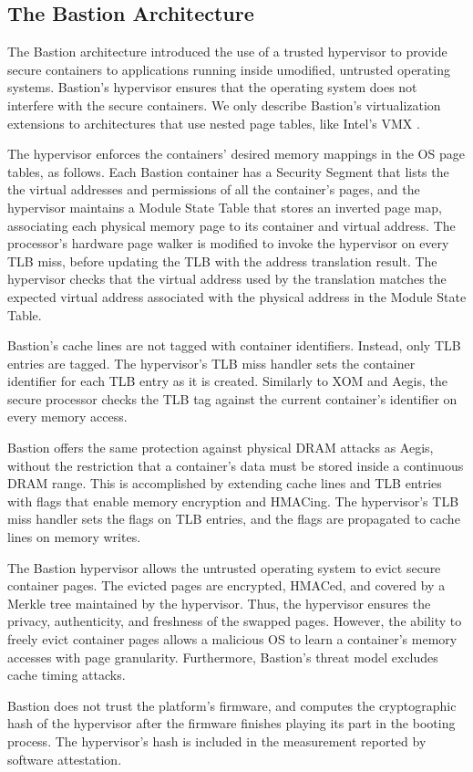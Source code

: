 \subsection{The Bastion Architecture}

The Bastion architecture \cite{champagne2010bastion} introduced the use of a
trusted hypervisor to provide secure containers to applications running inside
umodified, untrusted operating systems. Bastion's hypervisor ensures that the
operating system does not interfere with the secure containers. We only
describe Bastion's virtualization extensions to architectures that use nested
page tables, like Intel's VMX \cite{uhlig2005vmx}.

The hypervisor enforces the containers' desired memory mappings in the OS page
tables, as follows. Each Bastion container has a Security Segment that lists
the the virtual addresses and permissions of all the container's pages, and the
hypervisor maintains a Module State Table that stores an inverted page map,
associating each physical memory page to its container and virtual address. The
processor's hardware page walker is modified to invoke the hypervisor on every
TLB miss, before updating the TLB with the address translation result. The
hypervisor checks that the virtual address used by the translation matches the
expected virtual address associated with the physical address in the Module
State Table.

Bastion's cache lines are not tagged with container identifiers. Instead, only
TLB entries are tagged. The hypervisor's TLB miss handler sets the container
identifier for each TLB entry as it is created. Similarly to XOM and Aegis, the
secure processor checks the TLB tag against the current container's identifier
on every memory access.

Bastion offers the same protection against physical DRAM attacks as Aegis,
without the restriction that a container's data must be stored inside a
continuous DRAM range. This is accomplished by extending cache lines and TLB
entries with flags that enable memory encryption and HMACing. The hypervisor's
TLB miss handler sets the flags on TLB entries, and the flags are propagated to
cache lines on memory writes.

The Bastion hypervisor allows the untrusted operating system to evict secure
container pages. The evicted pages are encrypted, HMACed, and covered by a
Merkle tree maintained by the hypervisor. Thus, the hypervisor ensures the
privacy, authenticity, and freshness of the swapped pages. However, the ability
to freely evict container pages allows a malicious OS to learn a container's
memory accesses with page granularity. Furthermore, Bastion's threat model
excludes cache timing attacks.

Bastion does not trust the platform's firmware, and computes the cryptographic
hash of the hypervisor after the firmware finishes playing its part in the
booting process. The hypervisor's hash is included in the measurement reported
by software attestation.
